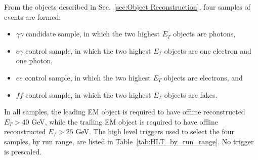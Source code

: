 \documentclass[dissertation.tex]{subfiles}
\begin{document}
From the objects described in Sec.~\ref{sec:Object Reconstruction}, four samples of events are formed:

\begin{itemize}
\item $\gamma\gamma$ candidate sample, in which the two highest $E_{T}$ objects are photons,
\item $e\gamma$ control sample, in which the two highest $E_{T}$ objects are one electron and one photon,
\item $ee$ control sample, in which the two highest $E_{T}$ objects are electrons, and
\item $\mathit{ff}$ control sample, in which the two highest $E_{T}$ objects are fakes.
\end{itemize}
%
In all samples, the leading EM object is required to have offline reconstructed $E_{T} > 40$ GeV, while the trailing EM object is required to have offline reconstructed $E_{T} > 25$ GeV.  The high level triggers used to select the four samples, by run range, are listed in Table~\ref{tab:HLT_by_run_range}.  No trigger is prescaled.
\end{document}

